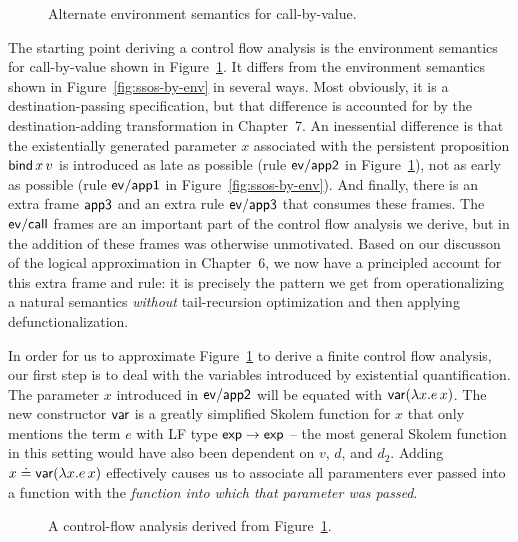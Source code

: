 \begin{figure}
\caption{Alternate environment semantics for call-by-value.}
\label{fig:dest-env}
\end{figure}

The starting point deriving a control flow analysis is the environment
semantics for call-by-value shown in Figure~\ref{fig:dest-env}. It
differs from the environment semantics shown in
Figure~\ref{fig:ssos-by-env} in several ways. Most obviously, it is a
destination-passing specification, but that difference is accounted
for by the destination-adding transformation in Chapter~7.  An
inessential difference is that the existentially generated parameter
$x$ associated with the persistent proposition ${\sf bind}\,x\,v$ is
introduced as late as possible (rule ${\sf ev/app2}$ in
Figure~\ref{fig:dest-env}), not as early as possible (rule ${\sf
  ev/app1}$ in Figure~\ref{fig:ssos-by-env}). And finally, there is an
extra frame ${\sf app3}$ and an extra rule ${\sf ev/app3}$ that
consumes these frames. The ${\sf ev/call}$ frames are an important
part of the control flow analysis we derive, but in
\cite{simmons11logical} the addition of these frames was otherwise
unmotivated. Based on our discusson of the logical
approximation in Chapter~6, we now have a principled account for this
extra frame and rule: it is precisely the pattern we get from
operationalizing a natural semantics {\it without} tail-recursion
optimization and then applying defunctionalization. 

In order for us to approximate Figure~\ref{fig:dest-env} to derive a
finite control flow analysis, our first step is to deal with the
variables introduced by existential quantification. The parameter $x$
introduced in ${\sf ev/app2}$ will be equated with ${\sf var}(\lambda
x.e\,x)$. The new constructor ${\sf var}$ is a greatly simplified
Skolem function for $x$ that only mentions the term $e$ with LF type
${\sf exp} \rightarrow {\sf exp}$ -- the most general Skolem function
in this setting would have also been dependent on $v$, $d$, and
$d_2$. Adding $x \doteq {\sf var}(\lambda x.e\,x)$ effectively causes
us to associate all paramenters ever passed into a function with the
{\it function into which that parameter was passed}. 

\begin{figure}
\caption{A control-flow analysis derived from Figure~\ref{fig:dest-env}.}
\label{fig:dest-cfa-1}
\end{figure}

